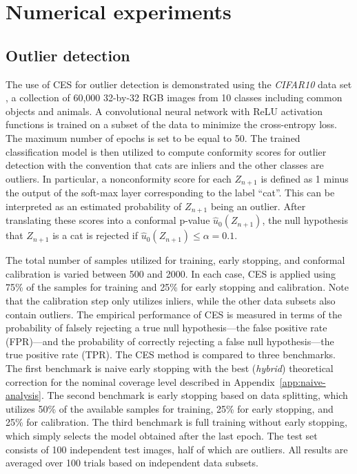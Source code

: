 \section{Numerical experiments} \label{sec:numerical_results}


\subsection{Outlier detection} \label{sec:num_od}

The use of CES for outlier detection is demonstrated using the {\em CIFAR10} data set \cite{cifar10}, a collection of 60,000 32-by-32 RGB images from 10 classes including common objects and animals.
A convolutional neural network with ReLU activation functions is trained on a subset of the data to minimize the cross-entropy loss. The maximum number of epochs is set to be equal to 50.
The trained classification model is then utilized to compute conformity scores for outlier detection with the convention that cats are inliers and the other classes are outliers.
In particular, a nonconformity score for each $Z_{n+1}$ is defined as 1 minus the output of the soft-max layer corresponding to the label ``cat''.
This can be interpreted as an estimated probability of $Z_{n+1}$ being an outlier.
After translating these scores into a conformal p-value $\hat{u}_0(Z_{n+1})$, the null hypothesis that $Z_{n+1}$ is a cat is rejected if $\hat{u}_0(Z_{n+1}) \leq \alpha = 0.1$.

The total number of samples utilized for training, early stopping, and conformal calibration is varied between 500 and 2000.
In each case, CES is applied using 75\% of the samples for training and 25\% for early stopping and calibration. Note that the calibration step only utilizes inliers, while the other data subsets also contain outliers.
The empirical performance of CES is measured in terms of the probability of falsely rejecting a true null hypothesis---the false positive rate (FPR)---and the probability of correctly rejecting a false null hypothesis---the true positive rate (TPR).
The CES method is compared to three benchmarks. The first benchmark is naive early stopping with the best ({\em hybrid}) theoretical correction for the nominal coverage level described in Appendix~\ref{app:naive-analysis}. The second benchmark is early stopping based on data splitting, which utilizes 50\% of the available samples for training, 25\% for early stopping, and 25\% for calibration.
The third benchmark is full training without early stopping, which simply selects the model obtained after the last epoch.
The test set consists of 100 independent test images, half of which are outliers.
All results are averaged over 100 trials based on independent data subsets.

